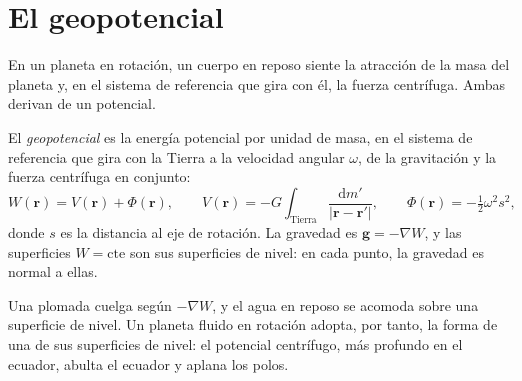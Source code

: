 \section{El geopotencial}

En un planeta en rotación, un cuerpo en reposo siente la atracción de la masa del planeta
y, en el sistema de referencia que gira con él, la fuerza centrífuga. Ambas derivan de un
potencial.

\begin{definition}[Geopotencial]\label{def:b3:gravity-geodesy:geopotential}
El \emph{geopotencial} es la energía potencial por unidad de
masa, en el sistema de referencia que gira con la Tierra a la velocidad angular $\omega$, de
la gravitación y la fuerza centrífuga en conjunto:
\[
  W(\mathbf r) = V(\mathbf r) + \Phi(\mathbf r),\qquad
  V(\mathbf r) = -G\int_{\text{Tierra}}\frac{\mathrm dm'}{|\mathbf r - \mathbf r'|},\qquad
  \Phi(\mathbf r) = -\tfrac12\omega^2 s^2,
\]
donde $s$ es la distancia al eje de rotación. La gravedad es
$\mathbf g = -\nabla W$, y las superficies $W = \text{cte}$ son sus
superficies de nivel: en cada punto, la gravedad es normal a ellas.
\end{definition}

Una plomada cuelga según $-\nabla W$, y el agua en reposo se acomoda sobre una
superficie de nivel. Un planeta fluido en rotación adopta, por tanto, la forma de una de sus
superficies de nivel: el potencial centrífugo, más profundo en el ecuador, abulta el
ecuador y aplana los polos.

